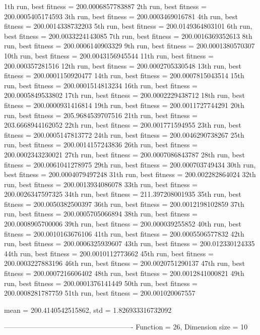 1th run, best fitness = 200.0006857783887
2th run, best fitness = 200.0005405174593
3th run, best fitness = 200.0003469016781
4th run, best fitness = 200.0014338732203
5th run, best fitness = 200.0149364803101
6th run, best fitness = 200.0033224143085
7th run, best fitness = 200.0016369352613
8th run, best fitness = 200.0006140903329
9th run, best fitness = 200.0001380570307
10th run, best fitness = 200.0043156945544
11th run, best fitness = 200.000357281516
12th run, best fitness = 200.0002705330548
13th run, best fitness = 200.0001150920477
14th run, best fitness = 200.0007815043514
15th run, best fitness = 200.0001514813234
16th run, best fitness = 200.0005849533802
17th run, best fitness = 200.0002229438712
18th run, best fitness = 200.0000931416814
19th run, best fitness = 200.0011727744291
20th run, best fitness = 205.9684539707516
21th run, best fitness = 203.6668944162052
22th run, best fitness = 200.001771594955
23th run, best fitness = 200.0005147813772
24th run, best fitness = 200.0046290738267
25th run, best fitness = 200.0014157243836
26th run, best fitness = 200.0002343230021
27th run, best fitness = 200.0007086843787
28th run, best fitness = 200.0061041278975
29th run, best fitness = 200.000703749434
30th run, best fitness = 200.0004079497248
31th run, best fitness = 200.002282864024
32th run, best fitness = 200.0013934086078
33th run, best fitness = 200.0026347597325
34th run, best fitness = 211.397208001935
35th run, best fitness = 200.0050382500397
36th run, best fitness = 200.0012198102859
37th run, best fitness = 200.0005705066894
38th run, best fitness = 200.0008905700006
39th run, best fitness = 200.000039255852
40th run, best fitness = 200.0010163676106
41th run, best fitness = 200.0005506577832
42th run, best fitness = 200.0006325939607
43th run, best fitness = 200.012330124335
44th run, best fitness = 200.0010112773662
45th run, best fitness = 200.0003227883196
46th run, best fitness = 200.0020751290137
47th run, best fitness = 200.0007216606402
48th run, best fitness = 200.0012841000821
49th run, best fitness = 200.0001376141449
50th run, best fitness = 200.0008281787759
51th run, best fitness = 200.001020067557

mean = 200.4140542515862, std = 1.826933316732092

-------------------------------------------------------
Function = 26, Dimension size = 10

